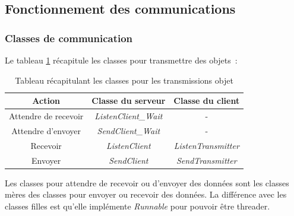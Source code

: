\documentclass[a4paper,11pt]{report}
\begin{document}
\subsection{Fonctionnement des communications}

\subsubsection{Classes de communication}
Le tableau \ref{tab1comClasses} récapitule les classes pour transmettre des objets :

  \begin{table}
    \begin{center}
      \begin{tabular}{|c|c|c|}
         \hline \textbf{Action}&\textbf{Classe du serveur}&\textbf{Classe du client} \\
         \hline Attendre de recevoir&\textit{ListenClient\_Wait}&- \\
         \hline Attendre d’envoyer&\textit{SendClient\_Wait}&- \\
         \hline Recevoir&\textit{ListenClient}&\textit{ListenTransmitter} \\
         \hline Envoyer&\textit{SendClient}&\textit{SendTransmitter}\\
         \hline
      \end{tabular}
      \caption{Tableau récapitulant les classes pour les transmissions objet}  
      \label{tab1comClasses}
    \end{center}
  \end{table}
  
  Les classes pour attendre de recevoir ou d’envoyer des données sont les classes mères des classes pour envoyer ou recevoir des données. La différence avec les classes filles est qu’elle implémente \textit{Runnable} pour pouvoir être threader.
\end{document}
